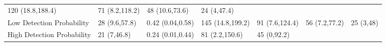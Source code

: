 \documentclass[
]{article}
\begin{document}
\begin{longtable}[]{@{}lllllll@{}}
\begin{minipage}[t]{0.11\columnwidth}
120 (18.8,188.4)\strut
\end{minipage} & \begin{minipage}[t]{0.11\columnwidth}\raggedright
71 (8.2,118.2)\strut
\end{minipage} & \begin{minipage}[t]{0.09\columnwidth}\raggedright
48 (10.6,73.6)\strut
\end{minipage} & \begin{minipage}[t]{0.10\columnwidth}\raggedright
24 (4,47.4)\strut
\end{minipage}\tabularnewline
\begin{minipage}[t]{0.18\columnwidth}\raggedright
Low Detection Probability\strut
\end{minipage} & \begin{minipage}[t]{0.12\columnwidth}\raggedright
28 (9.6,57.8)\strut
\end{minipage} & \begin{minipage}[t]{0.10\columnwidth}\raggedright
0.42 (0.04,0.58)\strut
\end{minipage} & \begin{minipage}[t]{0.11\columnwidth}\raggedright
145 (14.8,199.2)\strut
\end{minipage} & \begin{minipage}[t]{0.11\columnwidth}\raggedright
91 (7.6,124.4)\strut
\end{minipage} & \begin{minipage}[t]{0.09\columnwidth}\raggedright
56 (7.2,77.2)\strut
\end{minipage} & \begin{minipage}[t]{0.10\columnwidth}\raggedright
25 (3,48)\strut
\end{minipage}\tabularnewline
\begin{minipage}[t]{0.18\columnwidth}\raggedright
High Detection Probability\strut
\end{minipage} & \begin{minipage}[t]{0.12\columnwidth}\raggedright
21 (7,46.8)\strut
\end{minipage} & \begin{minipage}[t]{0.10\columnwidth}\raggedright
0.24 (0.01,0.44)\strut
\end{minipage} & \begin{minipage}[t]{0.11\columnwidth}\raggedright
81 (2.2,150.6)\strut
\end{minipage} & \begin{minipage}[t]{0.11\columnwidth}\raggedright
45 (0,92.2)\strut
\end{minipage} & \begin{minipage}[t]{0.09\columnwidth}\raggedright

\end{minipage}
\end{longtable}
\end{document}
